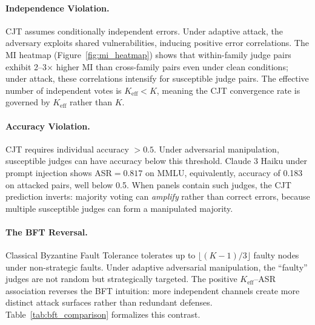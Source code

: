 \paragraph{Independence Violation.} CJT assumes conditionally independent errors. Under adaptive attack, the adversary exploits shared vulnerabilities, inducing positive error correlations. The MI heatmap (Figure~\ref{fig:mi_heatmap}) shows that within-family judge pairs exhibit 2--3$\times$ higher MI than cross-family pairs even under clean conditions; under attack, these correlations intensify for susceptible judge pairs. The effective number of independent votes is $K_{\mathrm{eff}} < K$, meaning the CJT convergence rate is governed by $K_{\mathrm{eff}}$ rather than $K$.

\paragraph{Accuracy Violation.} CJT requires individual accuracy ${>}0.5$. Under adversarial manipulation, susceptible judges can have accuracy below this threshold. Claude 3 Haiku under prompt injection shows ASR${=}0.817$ on MMLU, equivalently, accuracy of 0.183 on attacked pairs, well below 0.5. When panels contain such judges, the CJT prediction inverts: majority voting can \emph{amplify} rather than correct errors, because multiple susceptible judges can form a manipulated majority.

\paragraph{The BFT Reversal.} Classical Byzantine Fault Tolerance \citep{lamport1982byzantine} tolerates up to $\lfloor(K-1)/3\rfloor$ faulty nodes under non-strategic faults. Under adaptive adversarial manipulation, the ``faulty'' judges are not random but strategically targeted. The positive $K_{\mathrm{eff}}$--ASR association reverses the BFT intuition: more independent channels create more distinct attack surfaces rather than redundant defenses. Table~\ref{tab:bft_comparison} formalizes this contrast.


